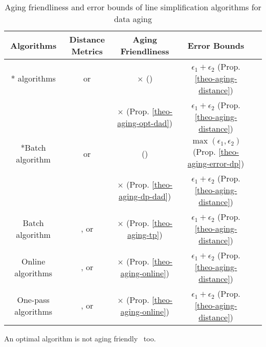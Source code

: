 \begin{table}
	\renewcommand{\arraystretch}{1.20}
	\vspace{-1ex}
	\caption{\small Aging friendliness and error bounds of line simplification algorithms for data aging}
	\label{tab:summary-data-aging}
	\centering
	\scriptsize
	\begin{tabular}{|c|c|c|c|c|}
		\hline
		{\bf{Algorithms}} &\bf{Distance Metrics} & \bf{Aging Friendliness} &  {\bf{Error Bounds}}  \\		
		\hline

		{\multirow{2}*{{\opt} algorithms}} &\ped or \sed	& \hspace{2ex} $\times$ (\cite{Cao:Spatio})  & $\epsilon_1 + \epsilon_2$  (Prop. \ref{theo-aging-distance})	\\
		\cline{2-4}
		
		&\dad	& $\times$  (Prop. \ref{theo-aging-opt-dad}) &$\epsilon_1 + \epsilon_2$  (Prop. \ref{theo-aging-distance})\\
		\hline
		
		{\multirow{2}*{Batch algorithm \dpa}} &\ped or \sed	&\checkmark (\cite{Cao:Spatio})  & $\max(\epsilon_1, \epsilon_2)$   (Prop. \ref{theo-aging-error-dp})\\
		\cline{2-4}
		
		&\dad	& $\times$  (Prop. \ref{theo-aging-dp-dad})  & $\epsilon_1 + \epsilon_2$   (Prop. \ref{theo-aging-distance})\\
		\hline
		
		{Batch algorithm \tpa}	& \ped, \sed or \dad & $\times$  (Prop. \ref{theo-aging-tp})  &$\epsilon_1 + \epsilon_2$  (Prop. \ref{theo-aging-distance})  \\
		\hline
		
		{Online algorithms}	& \ped, \sed or \dad & $\times$  (Prop. \ref{theo-aging-online}) &$\epsilon_1 + \epsilon_2$  (Prop. \ref{theo-aging-distance})  \\
		\hline

		{One-pass algorithms}	& \ped, \sed or \dad & $\times$ (Prop. \ref{theo-aging-online}) &$\epsilon_1 + \epsilon_2$  (Prop. \ref{theo-aging-distance})  \\

		\hline
	\end{tabular}
	\vspace{-2ex}
\end{table}




\begin{proposition}
	\label{theo-aging-opt-dad}
	An optimal algorithm is not aging friendly \wrt~\dad too.
\end{proposition}

